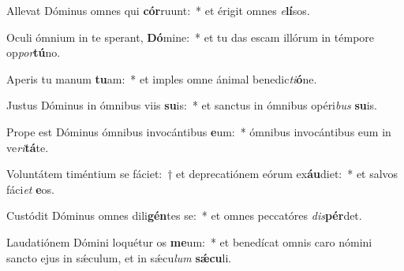 \item Allevat Dóminus omnes qui \textbf{cór}ruunt:~* et érigit omnes \textit{e}\textbf{lí}sos.
\item Oculi ómnium in te sperant, \textbf{Dó}mine:~* et tu das escam illórum in témpore op\textit{por}\textbf{tú}no.
\item Aperis tu manum \textbf{tu}am:~* et imples omne ánimal benedic\textit{ti}\textbf{ó}ne.
\item Justus Dóminus in ómnibus viis \textbf{su}is:~* et sanctus in ómnibus opéri\textit{bus} \textbf{su}is.
\item Prope est Dóminus ómnibus invocántibus \textbf{e}um:~* ómnibus invocántibus eum in ve\textit{ri}\textbf{tá}te.
\item Voluntátem timéntium se fáciet:~† et deprecatiónem eórum ex\textbf{áu}diet:~* et salvos fáci\textit{et} \textbf{e}os.
\item Custódit Dóminus omnes dili\textbf{gén}tes se:~* et omnes peccatóres \textit{dis}\textbf{pér}det.
\item Laudatiónem Dómini loquétur os \textbf{me}um:~* et benedícat omnis caro nómini sancto ejus in sǽculum, et in sǽcu\textit{lum} \textbf{sǽ}\textbf{cu}li.
